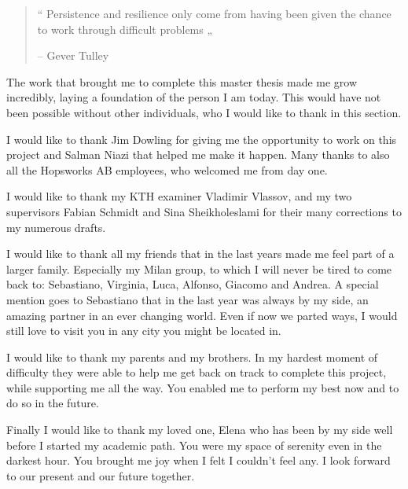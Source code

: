 
\begin{quote}
    “ Persistence and resilience only come from having been given the chance to work through difficult problems „

    -- Gever Tulley
\end{quote}
The work that brought me to complete this master thesis made me grow incredibly, laying a foundation of the person I am today. This would have not been possible without other individuals, who I would like to thank in this section.

I would like to thank Jim Dowling for giving me the opportunity to work on this project and Salman Niazi that helped me make it happen. Many thanks to also all the Hopsworks AB employees, who welcomed me from day one.

I would like to thank my KTH examiner Vladimir Vlassov, and my two supervisors Fabian Schmidt and Sina Sheikholeslami for their many corrections to my numerous drafts.

I would like to thank all my friends that in the last years made me feel part of a larger family. Especially my Milan group, to which I will never be tired to come back to: Sebastiano, Virginia, Luca, Alfonso, Giacomo and Andrea. A special mention goes to Sebastiano that in the last year was always by my side, an amazing partner in an ever changing world. Even if now we parted ways, I would still love to visit you in any city you might be located in.

I would like to thank my parents and my brothers. In my hardest moment of difficulty they were able to help me get back on track to complete this project, while supporting me all the way. You enabled me to perform my best now and to do so in the future.

Finally I would like to thank my loved one, Elena who has been by my side well before I started my academic path. You were my space of serenity even in the darkest hour. You brought me joy when I felt I couldn't feel any. I look forward to our present and our future together.
